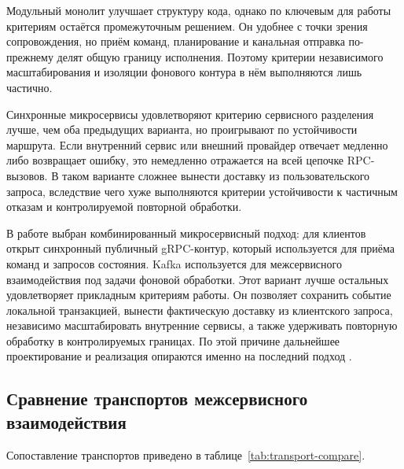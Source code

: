 Модульный монолит улучшает структуру кода, однако по ключевым для работы критериям остаётся промежуточным решением. Он удобнее с точки зрения сопровождения, но приём команд, планирование и канальная отправка по-прежнему делят общую границу исполнения. Поэтому критерии независимого масштабирования и изоляции фонового контура в нём выполняются лишь частично.

Синхронные микросервисы удовлетворяют критерию сервисного разделения лучше, чем оба предыдущих варианта, но проигрывают по устойчивости маршрута. Если внутренний сервис или внешний провайдер отвечает медленно либо возвращает ошибку, это немедленно отражается на всей цепочке RPC-вызовов. В таком варианте сложнее вынести доставку из пользовательского запроса, вследствие чего хуже выполняются критерии устойчивости к частичным отказам и контролируемой повторной обработки.

В работе выбран комбинированный микросервисный подход: для клиентов открыт синхронный публичный gRPC-контур, который используется для приёма команд и запросов состояния. Kafka используется для межсервисного взаимодействия под задачи фоновой обработки. Этот вариант лучше остальных удовлетворяет прикладным критериям работы. Он позволяет сохранить событие локальной транзакцией, вынести фактическую доставку из клиентского запроса, независимо масштабировать внутренние сервисы, а также удерживать повторную обработку в контролируемых границах. По этой причине дальнейшее проектирование и реализация опираются именно на последний подход \cite{newman_microservices,richardson_patterns}.

\subsection{Сравнение транспортов межсервисного взаимодействия}

Сопоставление транспортов приведено в таблице~\ref{tab:transport-compare}.

